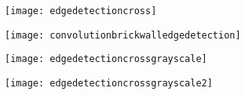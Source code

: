	\begin{figure}[h]
		\centering
		\texttt{[image: edgedetectioncross]}
		\caption{}
		\label{fig:edgedetectioncross}
	\end{figure}
	\begin{figure}[h]
		\centering
		\texttt{[image: convolutionbrickwalledgedetection]}
		\caption{}
		\label{fig:convolutionbrickwalledgedetection}
	\end{figure}
	\begin{figure}[h]
		\centering
		\texttt{[image: edgedetectioncrossgrayscale]}
		\caption{}
		\label{fig:edgedetectioncrossgrayscale}
	\end{figure}
	\begin{figure}[h]
		\centering
		\texttt{[image: edgedetectioncrossgrayscale2]}
		\caption{}
		\label{fig:edgedetectioncrossgrayscale2}
	\end{figure}

